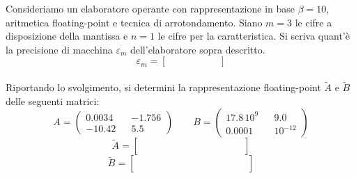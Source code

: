 Consideriamo un elaboratore operante con rappresentazione in base 
$\beta=10$, aritmetica floating-point e tecnica di 
arrotondamento. Siano $m=3$ le cifre a disposizione della 
mantissa e $n=1$ le cifre per la caratteristica. Si scriva 
quant'\`{e} la precisione di macchina $\varepsilon_m$ 
dell'elaboratore sopra descritto.
\medskip
$$ \varepsilon_m=\left [
\begin{array}{ccc}
\quad &  \quad & \quad \\
\quad &  \quad & \quad
\end{array}\right]$$
\\
\noindent Riportando lo svolgimento, si determini la 
rappresentazione floating-point $\widetilde{A}$ e $\widetilde{B}$ 
delle seguenti matrici:
\[
A=\left(
\begin{array}{ccc}
0.0034 && -1.756 \\
-10.42 && 5.5
\end{array}
\right ) \quad \quad B=\left(
\begin{array}{ccc}
17.8\, 10^{9} & & 9.0 \\
0.0001 &  & 10^{-12}
\end{array}
\right )
\]
\vspace*{5cm}
\[
\widetilde{A}=\left [
\begin{array}{cccccccccccccc}
\quad &  \quad & \quad &  \quad & \quad & \quad \\
\quad &  \quad & \quad &  \quad & \quad & \quad \\
\quad &  \quad & \quad &  \quad & \quad & \quad \\
\quad &  \quad & \quad &  \quad  & \quad  & \quad
\end{array}\right]
\]
\medskip
\[
\widetilde{B}=\left [
\begin{array}{cccccccccccccc}
\quad &  \quad & \quad &  \quad & \quad & \quad \\
\quad &  \quad & \quad &  \quad & \quad & \quad \\
\quad &  \quad & \quad &  \quad & \quad & \quad \\
\quad &  \quad & \quad &  \quad  & \quad  & \quad &
\end{array}\right]
\]
